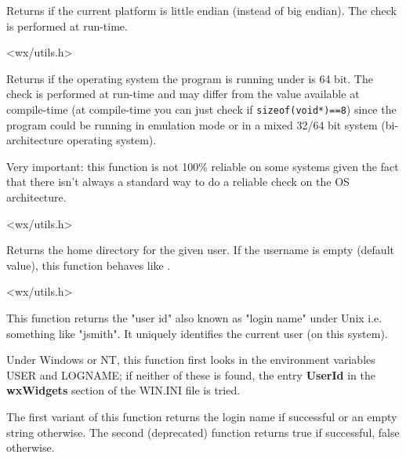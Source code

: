 Returns \true if the current platform is little endian (instead of big endian).
The check is performed at run-time.




<wx/utils.h>


\label{wxisplatform64bit}


Returns \true if the operating system the program is running under is 64 bit.
The check is performed at run-time and may differ from the value available at
compile-time (at compile-time you can just check if {\tt sizeof(void*)==8})
since the program could be running in emulation mode or in a mixed 32/64 bit system
(bi-architecture operating system).

Very important: this function is not 100\% reliable on some systems given the fact
that there isn't always a standard way to do a reliable check on the OS architecture.


<wx/utils.h>


\label{wxgetuserhome}


Returns the home directory for the given user. If the username is empty
(default value), this function behaves like
.


<wx/utils.h>


\label{wxgetuserid}



This function returns the "user id" also known as "login name" under Unix i.e.
something like "jsmith". It uniquely identifies the current user (on this system).

Under Windows or NT, this function first looks in the environment
variables USER and LOGNAME; if neither of these is found, the entry {\bf UserId}\rtfsp
in the {\bf wxWidgets} section of the WIN.INI file is tried.

The first variant of this function returns the login name if successful or an
empty string otherwise. The second (deprecated) function returns true
if successful, false otherwise.

